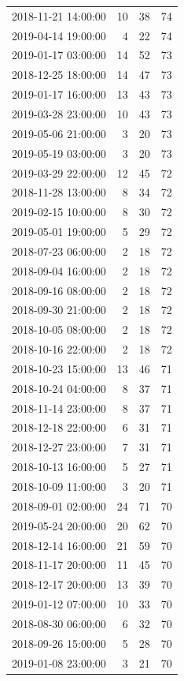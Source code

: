 \begin{tabular}{lrrr}
2018-11-21 14:00:00 & 10 & 38 & 74 \\
2019-04-14 19:00:00 & 4 & 22 & 74 \\
2019-01-17 03:00:00 & 14 & 52 & 73 \\
2018-12-25 18:00:00 & 14 & 47 & 73 \\
2019-01-17 16:00:00 & 13 & 43 & 73 \\
2019-03-28 23:00:00 & 10 & 43 & 73 \\
2019-05-06 21:00:00 & 3 & 20 & 73 \\
2019-05-19 03:00:00 & 3 & 20 & 73 \\
2019-03-29 22:00:00 & 12 & 45 & 72 \\
2018-11-28 13:00:00 & 8 & 34 & 72 \\
2019-02-15 10:00:00 & 8 & 30 & 72 \\
2019-05-01 19:00:00 & 5 & 29 & 72 \\
2018-07-23 06:00:00 & 2 & 18 & 72 \\
2018-09-04 16:00:00 & 2 & 18 & 72 \\
2018-09-16 08:00:00 & 2 & 18 & 72 \\
2018-09-30 21:00:00 & 2 & 18 & 72 \\
2018-10-05 08:00:00 & 2 & 18 & 72 \\
2018-10-16 22:00:00 & 2 & 18 & 72 \\
2018-10-23 15:00:00 & 13 & 46 & 71 \\
2018-10-24 04:00:00 & 8 & 37 & 71 \\
2018-11-14 23:00:00 & 8 & 37 & 71 \\
2018-12-18 22:00:00 & 6 & 31 & 71 \\
2018-12-27 23:00:00 & 7 & 31 & 71 \\
2018-10-13 16:00:00 & 5 & 27 & 71 \\
2018-10-09 11:00:00 & 3 & 20 & 71 \\
2018-09-01 02:00:00 & 24 & 71 & 70 \\
2019-05-24 20:00:00 & 20 & 62 & 70 \\
2018-12-14 16:00:00 & 21 & 59 & 70 \\
2018-11-17 20:00:00 & 11 & 45 & 70 \\
2018-12-17 20:00:00 & 13 & 39 & 70 \\
2019-01-12 07:00:00 & 10 & 33 & 70 \\
2018-08-30 06:00:00 & 6 & 32 & 70 \\
2018-09-26 15:00:00 & 5 & 28 & 70 \\
2019-01-08 23:00:00 & 3 & 21 & 70 \\

\end{tabular}
